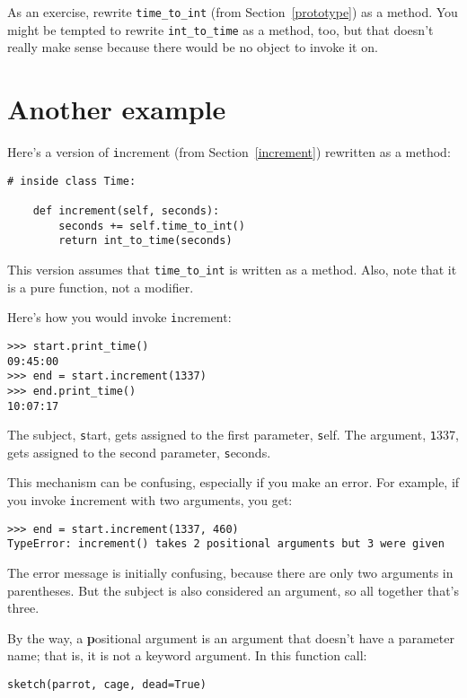 \documentclass[
DIV=11,
fontsize=12,
twoside,
headinclude=false,
titlepage=firstiscover,
abstract=true,
headsepline=true,
footsepline=true,
chapterprefix=true, %
headings=big,
bibliography=totoc,%
captions=tableheading
]{scrbook}
\theoremstyle{definition}
\begin{document}
As an exercise, rewrite \verb"time_to_int" (from
Section~\ref{prototype}) as a method.  You might be tempted to
rewrite \verb"int_to_time" as a method, too, but that doesn't
really make sense because there would be no object to invoke
it on.


\section{Another example}

Here's a version of {\texttt increment} (from Section~\ref{increment})
rewritten as a method:

\begin{lstlisting}
# inside class Time:

    def increment(self, seconds):
        seconds += self.time_to_int()
        return int_to_time(seconds)
\end{lstlisting}
%
This version assumes that \verb"time_to_int" is written
as a method.  Also, note that
it is a pure function, not a modifier.

Here's how you would invoke {\texttt increment}:

\begin{lstlisting}
>>> start.print_time()
09:45:00
>>> end = start.increment(1337)
>>> end.print_time()
10:07:17
\end{lstlisting}
%
The subject, {\texttt start}, gets assigned to the first parameter,
{\texttt self}.  The argument, {\texttt 1337}, gets assigned to the
second parameter, {\texttt seconds}.

This mechanism can be confusing, especially if you make an error.
For example, if you invoke {\texttt increment} with two arguments, you
get:

\begin{lstlisting}
>>> end = start.increment(1337, 460)
TypeError: increment() takes 2 positional arguments but 3 were given
\end{lstlisting}
%
The error message is initially confusing, because there are
only two arguments in parentheses.  But the subject is also
considered an argument, so all together that's three.

By the way, a {\textbf positional argument} is an argument that
doesn't have a parameter name; that is, it is not a keyword
argument.  In this function call:

\begin{lstlisting}
sketch(parrot, cage, dead=True)
\end{lstlisting}
\end{document}
